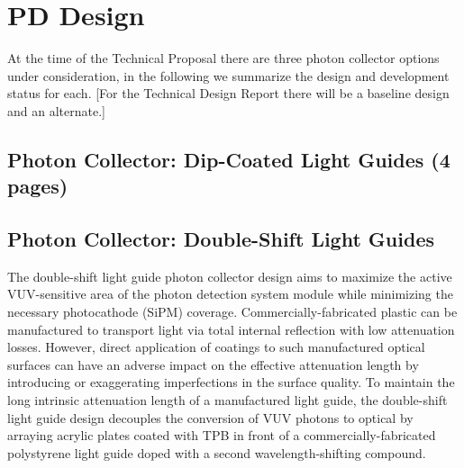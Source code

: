 \section{PD Design}
\label{sec:fdsp-pd-design}


At the time of the Technical Proposal there are three photon collector options  under consideration, 
in the following we summarize the design and development status for each. 
[For the Technical Design Report there will be a baseline design and an alternate.]



\subsection{\color{red}\bf Photon Collector: Dip-Coated Light Guides (4 pages)}
\label{ssec:fdsp-pd-pc-bar1}

\subsection{Photon Collector: Double-Shift Light Guides}
\label{ssec:fdsp-pd-pc-bar2}

The double-shift light guide photon collector design aims to maximize the active VUV-sensitive 
area of the photon detection system module while minimizing the necessary photocathode (SiPM) 
coverage. 
Commercially-fabricated plastic can be manufactured to transport light via total internal 
reflection with low attenuation losses. However, direct application of coatings to such
 manufactured optical surfaces can have an adverse impact on the effective attenuation length 
by introducing or exaggerating imperfections in the surface quality. 
To maintain the long intrinsic attenuation length of a manufactured light guide, the 
double-shift light guide design decouples the conversion of VUV photons to optical by
 arraying acrylic plates coated with TPB in front of a commercially-fabricated polystyrene 
light guide doped with a second wavelength-shifting compound.

